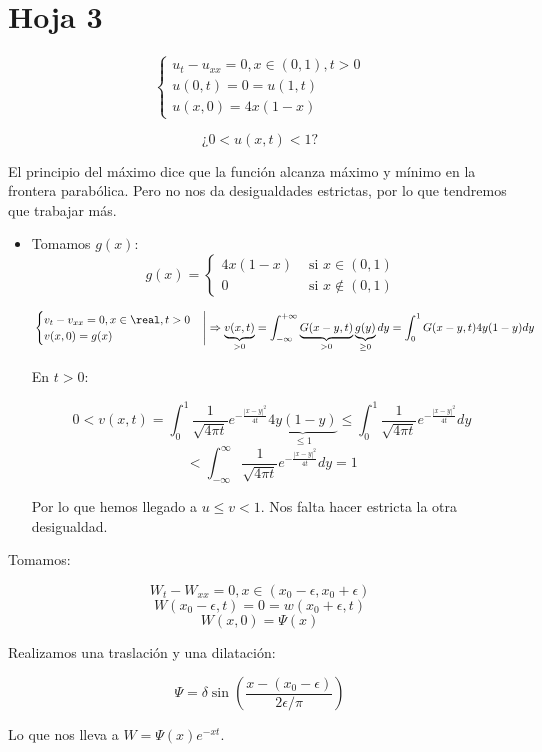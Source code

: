 \section{Hoja 3}

\begin{problem}[12]

	\[\begin{cases}
		u_t - u_{xx} = 0, x \in (0,1), t > 0\\
		u(0,t) = 0 = u(1,t)\\
		u(x,0) = 4x(1-x)
	\end{cases}\]

	\[\text{¿} 0 < u(x,t) < 1 \text{?}\]

\solution

	El principio del máximo dice que la función alcanza máximo y mínimo en la frontera parabólica. Pero no nos da desigualdades estrictas, por lo que tendremos que trabajar más.

	\begin{itemize}
		\item Tomamos $g(x)$:
		\[g(x) = \begin{cases}
			4x(1-x) & \text{ si } x \in (0,1) \\
			0 & \text{ si } x \not\in (0,1)
		\end{cases}\]

		\[ \left. \begin{cases} v_t - v_{xx} = 0, x \in \real, t > 0 \\
			v(x,0) = g(x)
		\end{cases} \right| \Rightarrow \underbrace{v(x,t)}_{>0} = \int_{-\infty}^{+\infty} \underbrace{G(x-y,t)}_{>0} \underbrace{g(y)}_{\geq 0} dy = \int_0^1 G(x-y,t) 4y(1-y) dy \]

		En $t > 0$:

			\[ 0 < v(x,t) = \int_0^1  \frac{1}{\sqrt{4\pi t}} e^{-\frac{|x-y|^2}{4t}} \underbrace{4y(1-y)}_{\leq 1} \leq \int_0^1 \frac{1}{\sqrt{4\pi t}} e^{-\frac{|x-y|^2}{4t}} dy \]
			\[ < \int_{-\infty}^{\infty}  \frac{1}{\sqrt{4\pi t}} e^{-\frac{|x-y|^2}{4t}} dy = 1 \]

			Por lo que hemos llegado a $u \leq v < 1$. Nos falta hacer estricta la otra desigualdad.
	\end{itemize}

	Tomamos:

	\[W_t - W_{xx} = 0, x \in (x_0 - \epsilon, x_0 + \epsilon)\]
	\[W(x_0-\epsilon,t) = 0 = w(x_0+\epsilon, t)\]
	\[W(x,0) = \Psi(x)\]

	Realizamos una traslación y una dilatación:

	\[ \Psi = \delta \sin(\frac{x- (x_0 - \epsilon)}{2\epsilon/\pi}) \]

	Lo que nos lleva a $W = \Psi(x) e^{-xt}$.

\end{problem}
